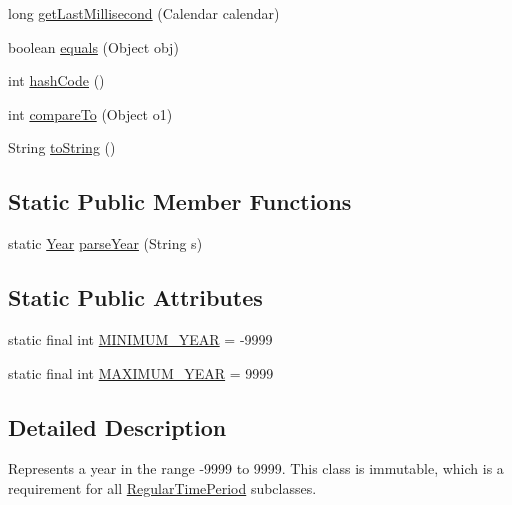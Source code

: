 \begin{DoxyCompactItemize}
\item 
long \mbox{\hyperlink{classorg_1_1jfree_1_1data_1_1time_1_1_year_a0e83766f160b644bd495c7d70570ce08}{get\+Last\+Millisecond}} (Calendar calendar)
\item 
boolean \mbox{\hyperlink{classorg_1_1jfree_1_1data_1_1time_1_1_year_ac994c8806ffdc5244ce2f4e9c4cf953d}{equals}} (Object obj)
\item 
int \mbox{\hyperlink{classorg_1_1jfree_1_1data_1_1time_1_1_year_a375116a62ffd54b37f6fb17d35e552ea}{hash\+Code}} ()
\item 
int \mbox{\hyperlink{classorg_1_1jfree_1_1data_1_1time_1_1_year_ad5e210a86acb2e54b134bdd1cde4fae2}{compare\+To}} (Object o1)
\item 
String \mbox{\hyperlink{classorg_1_1jfree_1_1data_1_1time_1_1_year_a1a9282b4a6890c347bfccadef2a68c61}{to\+String}} ()
\end{DoxyCompactItemize}
\subsection*{Static Public Member Functions}
\begin{DoxyCompactItemize}
\item 
static \mbox{\hyperlink{classorg_1_1jfree_1_1data_1_1time_1_1_year}{Year}} \mbox{\hyperlink{classorg_1_1jfree_1_1data_1_1time_1_1_year_a46251fbdfaeb9fb60f90d164ed1173cf}{parse\+Year}} (String s)
\end{DoxyCompactItemize}
\subsection*{Static Public Attributes}
\begin{DoxyCompactItemize}
\item 
static final int \mbox{\hyperlink{classorg_1_1jfree_1_1data_1_1time_1_1_year_a27210f049573ad8dcf5049cce284ecb2}{M\+I\+N\+I\+M\+U\+M\+\_\+\+Y\+E\+AR}} = -\/9999
\item 
static final int \mbox{\hyperlink{classorg_1_1jfree_1_1data_1_1time_1_1_year_abb76bd6ebcbd24a4b797c43d78ebcfa7}{M\+A\+X\+I\+M\+U\+M\+\_\+\+Y\+E\+AR}} = 9999
\end{DoxyCompactItemize}


\subsection{Detailed Description}
Represents a year in the range -\/9999 to 9999. This class is immutable, which is a requirement for all \mbox{\hyperlink{classorg_1_1jfree_1_1data_1_1time_1_1_regular_time_period}{Regular\+Time\+Period}} subclasses. 

